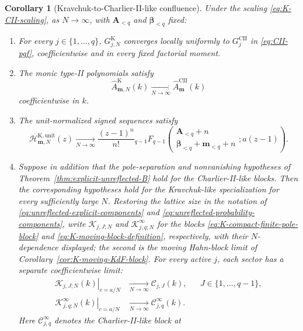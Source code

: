 \documentclass[10pt]{amsart}
\newcommand{\A}{\boldsymbol A}
\newcommand{\bbeta}{\boldsymbol\beta}
\newcommand{\mm}{\boldsymbol m}
\newcommand{\pFq}[5]{{}_{#1}F_{#2}\!\left(\begin{matrix}#3\\#4\end{matrix};#5\right)}
\theoremstyle{plain}
\newtheorem{corollary}[theorem]{Corollary}
\theoremstyle{definition}
\theoremstyle{remark}
\begin{document}
\begin{corollary}[Kravchuk-to-Charlier-II-like confluence]
\label{cor:K-to-CII}
Under the scaling \eqref{eq:K-CII-scaling}, as \(N\to\infty\), with
\(\A_{<q}\) and \(\bbeta_{<q}\) fixed:
\begin{enumerate}[label=\textup{(\roman*)}]
\item For every \(j\in\{1,\ldots,q\}\),
\(G_{j,N}^{\mathrm K}\) converges locally uniformly to
\(G_j^{\mathrm{CII}}\) in \eqref{eq:CII-pgf}, coefficientwise and in every
fixed factorial moment.
\item The monic type-II polynomials satisfy
\begin{equation}
 \widehat A_{\mm,N}^{\mathrm K}(k)
 \xrightarrow[N\to\infty]{}
 \widehat A_{\mm}^{\mathrm{CII}}(k)
 \label{eq:K-CII-A-limit}
\end{equation}
coefficientwise in \(k\).
\item The unit-normalized signed sequences satisfy
\begin{equation}
 \mathcal H_{\mm,N}^{\mathrm K,\mathrm{unit}}(z)
 \xrightarrow[N\to\infty]{}
 \frac{(z-1)^n}{n!}
 \pFq{q-1}{q-1}
 {\A_{<q}+n}
 {\bbeta_{<q}+\mm_{<q}+n}
 {a(z-1)}.
 \label{eq:K-CII-B-limit}
\end{equation}
\item Suppose in addition that the pole-separation and nonvanishing
hypotheses of Theorem~\ref{thm:explicit-unreflected-B} hold for the
Charlier-II-like blocks. Then the corresponding hypotheses hold for the Kravchuk-like
specialization for every sufficiently large \(N\). Restoring the lattice
size in the notation of \eqref{eq:unreflected-explicit-components} and
\eqref{eq:unreflected-probability-components}, write
\(\mathscr K_{j,J;N}\) and
\(\mathscr K_{j,q;N}^{\infty}\) for the blocks
\eqref{eq:K-compact-finite-pole-block} and
\eqref{eq:K-moving-block-definition}, respectively, with their
\(N\)-dependence displayed; the second is the moving Hahn-block limit of
Corollary~\ref{cor:K-moving-KdF-block}. For every active \(j\), each
sector has a separate coefficientwise limit:
\begin{align}
 \left.\mathscr K_{j,J;N}(k)\right|_{c=a/N}
 &\xrightarrow[N\to\infty]{}\mathscr C_{j,J}(k),
 &&J\in\{1,\ldots,q-1\},
 \label{eq:K-CII-finite-sector-limit}\\
 \left.\mathscr K_{j,q;N}^{\infty}(k)\right|_{c=a/N}
 &\xrightarrow[N\to\infty]{}\mathscr C_{j,q}^{\infty}(k).
 \label{eq:K-CII-infinity-sector-limit}
\end{align}
Here \(\mathscr C_{j,q}^{\infty}\) denotes the Charlier-II-like block at

\end{enumerate}
\end{corollary}
\end{document}
